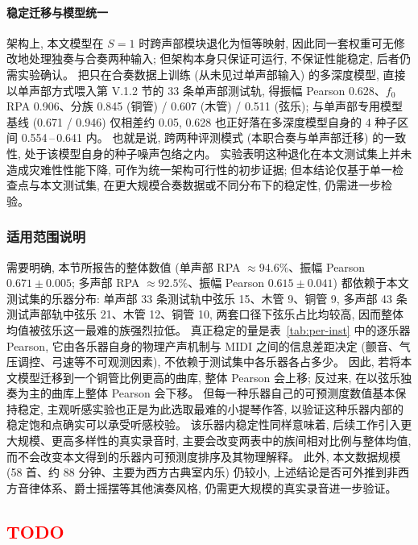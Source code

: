 \documentclass[a4paper, UTF8, zihao=-4, fontset=fandol]{ctexart}
\begin{document}
\paragraph{稳定迁移与模型统一}\quad
架构上, 本文模型在 $S = 1$ 时跨声部模块退化为恒等映射, 因此同一套权重可无修改地处理独奏与合奏两种输入; 但架构本身只保证可运行, 不保证性能稳定, 后者仍需实验确认。 把只在合奏数据上训练 (从未见过单声部输入) 的多深度模型, 直接以单声部方式喂入第 V.1.2 节的 33 条单声部测试轨, 得振幅 Pearson 0.628、$f_0$ RPA 0.906、分族 0.845 (铜管) / 0.607 (木管) / 0.511 (弦乐); 与单声部专用模型基线 (0.671 / 0.946) 仅相差约 0.05, 0.628 也正好落在多深度模型自身的 4 种子区间 0.554\,--\,0.641 内。 也就是说, 跨两种评测模式 (本职合奏与单声部迁移) 的一致性, 处于该模型自身的种子噪声包络之内。 实验表明这种退化在本文测试集上并未造成灾难性性能下降, 可作为统一架构可行性的初步证据; 但本结论仅基于单一检查点与本文测试集, 在更大规模合奏数据或不同分布下的稳定性, 仍需进一步检验。

\subsubsection{适用范围说明}

需要明确, 本节所报告的整体数值 (单声部 RPA $\approx 94.6\%$、振幅 Pearson $0.671 \pm 0.005$; 多声部 RPA $\approx 92.5\%$、振幅 Pearson $0.615 \pm 0.041$) 都依赖于本文测试集的乐器分布: 单声部 33 条测试轨中弦乐 15、木管 9、铜管 9, 多声部 43 条测试声部轨中弦乐 21、木管 12、铜管 10, 两套口径下弦乐占比均较高, 因而整体均值被弦乐这一最难的族强烈拉低。 真正稳定的量是表~\ref{tab:per-inst} 中的逐乐器 Pearson, 它由各乐器自身的物理产声机制与 MIDI 之间的信息差距决定 (颤音、气压调控、弓速等不可观测因素), 不依赖于测试集中各乐器各占多少。 因此, 若将本文模型迁移到一个铜管比例更高的曲库, 整体 Pearson 会上移; 反过来, 在以弦乐独奏为主的曲库上整体 Pearson 会下移。 但每一种乐器自己的可预测度数值基本保持稳定, 主观听感实验也正是为此选取最难的小提琴作答, 以验证这种乐器内部的稳定饱和点确实可以承受听感校验。 该乐器内稳定性同样意味着, 后续工作引入更大规模、更高多样性的真实录音时, 主要会改变两表中的族间相对比例与整体均值, 而不会改变本文得到的乐器内可预测度排序及其物理解释。 此外, 本文数据规模 (58 首、约 88 分钟、主要为西方古典室内乐) 仍较小, 上述结论是否可外推到非西方音律体系、爵士摇摆等其他演奏风格, 仍需更大规模的真实录音进一步验证。

\subsection{\textcolor{red}{TODO}}
\end{document}
